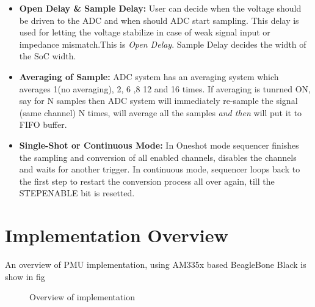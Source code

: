 \begin{itemize}
	\item \textbf{Open Delay \& Sample Delay:} User can decide when the voltage should be driven to the ADC and when should ADC start sampling. This delay is used for letting the voltage stabilize in case of weak signal input or impedance mismatch.This is \textit{Open Delay}. Sample Delay decides the width of the SoC width.
	\item \textbf{Averaging of Sample:} ADC system has an averaging system which averages 1(no averaging), 2, 6 ,8 12 and 16 times. If averaging is tunrned ON, say for N samples then ADC system will immediately re-sample the signal (same channel) N times, will average all the samples \textit{and then} will put it to FIFO buffer.
	\item \textbf{Single-Shot or Continuous Mode:} In Oneshot mode sequencer finishes the sampling and conversion of all enabled channels, disables the channels and waits for another trigger. In continuous mode, sequencer loops back to the first step to restart the conversion process all over again, till the STEPENABLE bit is resetted.    
\end{itemize} 

\section{Implementation Overview}
An overview of PMU implementation, using AM335x based BeagleBone Black is show in fig 
\begin{figure}
	
	\caption{Overview of implementation}
\end{figure}

